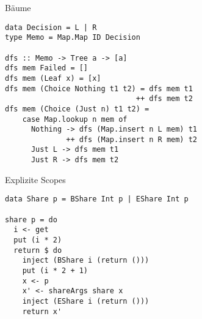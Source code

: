 \documentclass{beamer}
\begin{document}
\begin{frame}[fragile]{Bäume}
\begin{verbatim}
data Decision = L | R
type Memo = Map.Map ID Decision

dfs :: Memo -> Tree a -> [a]
dfs mem Failed = []
dfs mem (Leaf x) = [x]
dfs mem (Choice Nothing t1 t2) = dfs mem t1 
                              ++ dfs mem t2
dfs mem (Choice (Just n) t1 t2) =
    case Map.lookup n mem of
      Nothing -> dfs (Map.insert n L mem) t1 
              ++ dfs (Map.insert n R mem) t2
      Just L -> dfs mem t1
      Just R -> dfs mem t2
\end{verbatim}
\end{frame}

\begin{frame}[fragile]{Explizite Scopes}
\begin{verbatim}
data Share p = BShare Int p | EShare Int p

share p = do
  i <- get
  put (i * 2)
  return $ do
    inject (BShare i (return ()))
    put (i * 2 + 1)
    x <- p
    x' <- shareArgs share x
    inject (EShare i (return ()))
    return x'
\end{verbatim}
\end{frame}
\end{document}
